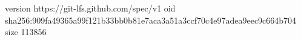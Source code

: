 version https://git-lfs.github.com/spec/v1
oid sha256:909fa49365a99f121b33bb0b81e7aca3a51a3ccf70c4e97adea9eec9c664b704
size 113856
